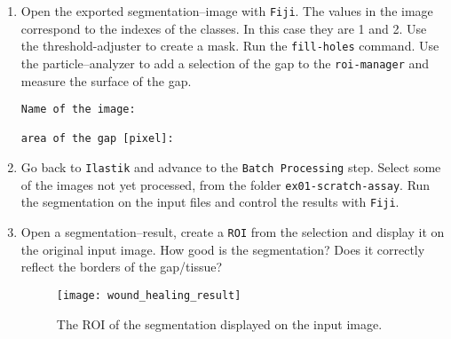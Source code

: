 \begin{enumerate}
\item Open the exported segmentation--image with {\tt Fiji}. The values in the image correspond to the indexes of the classes. In this case they are 1 and 2. Use the threshold-adjuster to create a mask. Run the {\tt fill-holes} command. Use the particle--analyzer to add a selection of the gap to the {\tt roi-manager} and measure the surface of the gap.
\begin{verbatim}
Name of the image:

area of the gap [pixel]: 
\end{verbatim}
\item Go back to {\tt Ilastik} and advance to the {\tt Batch Processing} step. Select some of the images not yet processed, from the folder {\tt ex01-scratch-assay}. Run the segmentation on the input files and control the results with {\tt Fiji}.

\item Open a segmentation--result, create a {\tt ROI} from the selection and display it on the original input image. How good is the segmentation? Does it correctly reflect the borders of the gap/tissue?
\begin{figure}[!htb]
 \centering
 \texttt{[image: wound\_healing\_result]}
 \caption{The ROI of the segmentation displayed on the input image.}
 \label{figure:ilastik-segmentation-result}
\end{figure}

\end{enumerate}